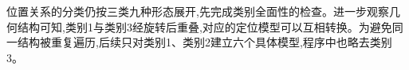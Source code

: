 位置关系的分类仍按三类九种形态展开,先完成类别全面性的检查。进一步观察几何结构可知,类别1与类别3经旋转后重叠,对应的定位模型可以互相转换。为避免同一结构被重复遍历,后续只对类别1、类别2建立六个具体模型,程序中也略去类别3。
